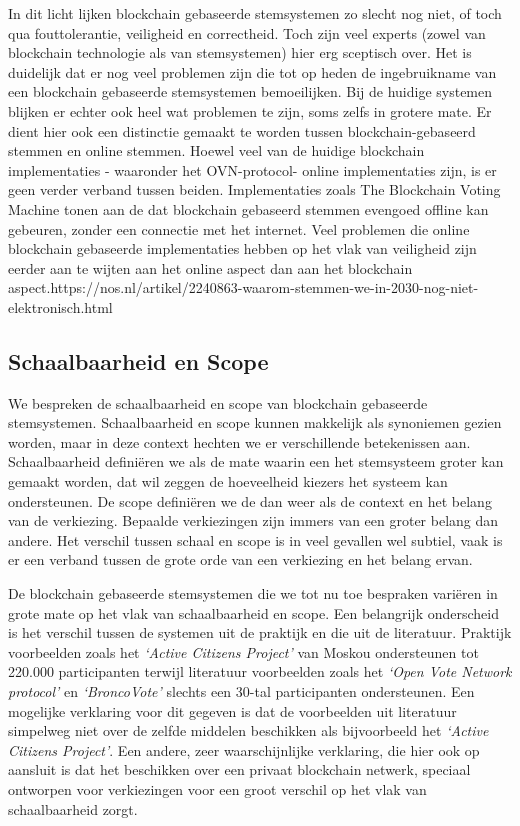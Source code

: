 	 In dit licht lijken blockchain gebaseerde stemsystemen zo slecht nog niet, of toch qua fouttolerantie, veiligheid en correctheid. Toch zijn veel experts (zowel van blockchain technologie als van stemsystemen) hier erg sceptisch over. Het is duidelijk dat er nog veel problemen zijn die tot op heden de ingebruikname van een blockchain gebaseerde stemsystemen bemoeilijken. Bij de huidige systemen blijken er echter ook heel wat problemen te zijn, soms zelfs in grotere mate. Er dient hier ook een distinctie gemaakt te worden tussen blockchain-gebaseerd stemmen en online stemmen. Hoewel veel van de huidige blockchain implementaties - waaronder het OVN-protocol- online implementaties zijn, is er geen verder verband tussen beiden. Implementaties zoals The Blockchain Voting Machine tonen aan de dat blockchain gebaseerd stemmen evengoed offline kan gebeuren, zonder een connectie met het internet. Veel problemen die online blockchain gebaseerde implementaties hebben op het vlak van veiligheid zijn eerder aan te wijten aan het online aspect dan aan het blockchain aspect.https://nos.nl/artikel/2240863-waarom-stemmen-we-in-2030-nog-niet-elektronisch.html
	 
	\subsection{Schaalbaarheid en Scope}
	We bespreken de schaalbaarheid en scope van blockchain gebaseerde stemsystemen. Schaalbaarheid en scope kunnen makkelijk als synoniemen gezien worden, maar in deze context hechten we er verschillende betekenissen aan. Schaalbaarheid definiëren we als de mate waarin een het stemsysteem groter kan gemaakt worden, dat wil zeggen de hoeveelheid kiezers het systeem kan ondersteunen. De scope definiëren we de dan weer als de context en het belang van de verkiezing. Bepaalde verkiezingen zijn immers van een groter belang dan andere. Het verschil tussen schaal en scope is in veel gevallen wel subtiel, vaak is er een verband tussen de grote orde van een verkiezing en het belang ervan.
	
	De blockchain gebaseerde stemsystemen die we tot nu toe bespraken variëren in grote mate op het vlak van schaalbaarheid en scope. Een belangrijk onderscheid is het verschil tussen de systemen uit de praktijk en die uit de literatuur. Praktijk voorbeelden zoals het  \textit{`Active Citizens Project'} van Moskou ondersteunen tot 220.000 participanten terwijl literatuur voorbeelden zoals het  \textit{`Open Vote Network protocol'} en  \textit{`BroncoVote'} slechts een 30-tal participanten ondersteunen. Een mogelijke verklaring voor dit gegeven is dat de voorbeelden uit literatuur simpelweg niet over de zelfde middelen beschikken als bijvoorbeeld het \textit{`Active Citizens Project'}. Een andere, zeer waarschijnlijke verklaring, die hier ook op aansluit is dat het beschikken over een privaat blockchain netwerk, speciaal ontworpen voor verkiezingen voor een groot verschil op het vlak van schaalbaarheid zorgt.
	
